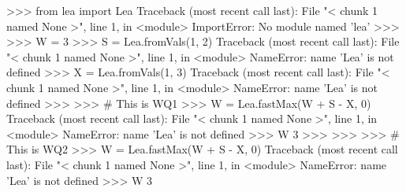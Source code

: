 
>>> from lea import Lea
Traceback (most recent call last):
  File "< chunk 1 named None >", line 1, in <module>
ImportError: No module named 'lea'
>>>
>>> W = 3
>>> S = Lea.fromVals(1,  2)
Traceback (most recent call last):
  File "< chunk 1 named None >", line 1, in <module>
NameError: name 'Lea' is not defined
>>> X = Lea.fromVals(1,  3)
Traceback (most recent call last):
  File "< chunk 1 named None >", line 1, in <module>
NameError: name 'Lea' is not defined
>>>
>>> # This is WQ1
>>> W = Lea.fastMax(W + S - X, 0)
Traceback (most recent call last):
  File "< chunk 1 named None >", line 1, in <module>
NameError: name 'Lea' is not defined
>>> W
3
>>>
>>>
>>> # This is WQ2
>>> W = Lea.fastMax(W + S - X, 0)
Traceback (most recent call last):
  File "< chunk 1 named None >", line 1, in <module>
NameError: name 'Lea' is not defined
>>> W
3

